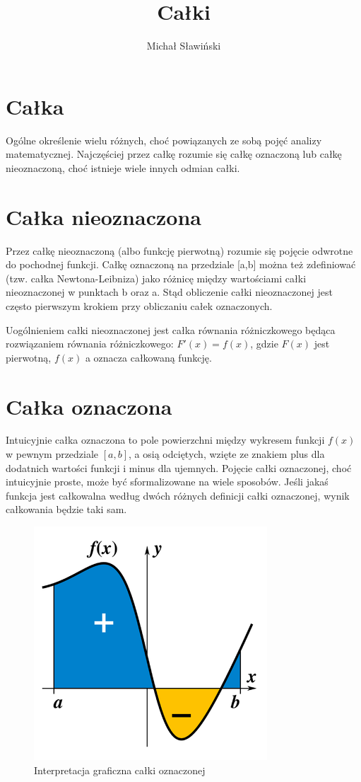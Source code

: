 \documentclass{article}
\title{Całki}
\author{Michał Sławiński}
\begin{document}
\maketitle
\tableofcontents
\section{Całka}
Ogólne określenie wielu różnych, choć powiązanych ze sobą pojęć analizy matematycznej. Najczęściej przez całkę rozumie się całkę oznaczoną lub całkę nieoznaczoną, choć istnieje wiele innych odmian całki.
\section{Całka nieoznaczona}
Przez całkę nieoznaczoną (albo funkcję pierwotną) rozumie się pojęcie odwrotne do pochodnej funkcji. Całkę oznaczoną na przedziale [a,b] można też zdefiniować (tzw. całka Newtona-Leibniza) jako różnicę między wartościami całki nieoznaczonej w punktach b oraz a. Stąd obliczenie całki nieoznaczonej jest często pierwszym krokiem przy obliczaniu całek oznaczonych.

Uogólnieniem całki nieoznaczonej jest całka równania różniczkowego będąca rozwiązaniem równania różniczkowego: $F'(x)=f(x)$, gdzie $F(x)$ jest pierwotną, $f(x)$ a oznacza całkowaną funkcję.
\section{Całka oznaczona}
Intuicyjnie całka oznaczona to pole powierzchni między wykresem funkcji $f(x)$ w pewnym przedziale $[a,b]$, a osią odciętych, wzięte ze znakiem plus dla dodatnich wartości funkcji i minus dla ujemnych. Pojęcie całki oznaczonej, choć intuicyjnie proste, może być sformalizowane na wiele sposobów. Jeśli jakaś funkcja jest całkowalna według dwóch różnych definicji całki oznaczonej, wynik całkowania będzie taki sam.

\begin{figure}
\caption{Interpretacja graficzna całki oznaczonej}
\label{fig:interpretacja}
\includegraphics[scale=1.5]{calka1.png}
\centering
\end{figure}
\end{document}
